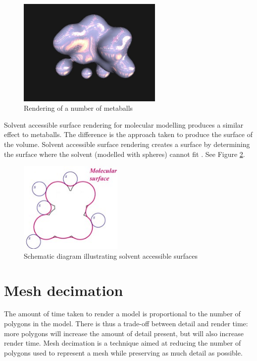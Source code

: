 \begin{figure}[h!]
  \begin{center}
    \includegraphics[width=70mm]{metaballs}
  \end{center}
  \caption{Rendering of a number of metaballs}
  \label{fig:background_metaballs}
\end{figure}

Solvent accessible surface rendering for molecular modelling produces a similar
effect to metaballs. The difference is the approach taken to produce the
surface of the volume. Solvent accessible surface rendering creates a surface
by determining the surface where the solvent (modelled with spheres) cannot fit
\citep{connolly83}. See Figure \ref{fig:background_sas}.

\begin{figure}[h!]
  \begin{center}
    \includegraphics[width=50mm]{sas_ms}
  \end{center}
  \caption{Schematic diagram illustrating solvent accessible surfaces}
  \label{fig:background_sas}
\end{figure}



\section{Mesh decimation}
\label{sec:background_decimation}

The amount of time taken to render a model is proportional to the number of
polygons in the model.  There is thus a trade-off between detail and render
time: more polygons will increase the amount of detail present, but will also
increase render time.  Mesh decimation is a technique aimed at reducing the
number of polygons used to represent a mesh while preserving as much detail as
possible.

